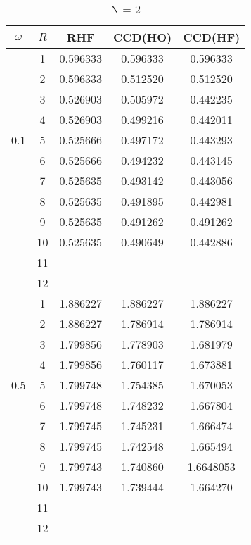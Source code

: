 \documentclass[
    a4paper, aps, twocolumn, floatfix, superscriptaddress,
    nofootinbib]{revtex4-1}
\newcommand{\1}{\mathds{1}}
\begin{document}
    \begin{table}
        \centering
        \caption{N = 2}
        \begin{ruledtabular}
            \begin{tabular}{c|c|ccc}
                $\omega$ & $R$ & RHF & CCD(HO) & CCD(HF) \\ \hline
                         &  1  & 0.596333 & 0.596333 & 0.596333 \\
                         &  2  & 0.596333 & 0.512520 & 0.512520 \\
                         &  3  & 0.526903 & 0.505972 & 0.442235 \\
                         &  4  & 0.526903 & 0.499216 & 0.442011 \\
                     0.1 &  5  & 0.525666 & 0.497172 & 0.443293 \\
                         &  6  & 0.525666 & 0.494232 & 0.443145 \\
                         &  7  & 0.525635 & 0.493142 & 0.443056 \\
                         &  8  & 0.525635 & 0.491895 & 0.442981 \\
                         &  9  & 0.525635 & 0.491262 & 0.491262 \\
                         &  10 & 0.525635 & 0.490649 & 0.442886 \\
                         &  11 & & & \\
                         &  12 &  & & \\ \hline

                         &  1  & 1.886227 & 1.886227 & 1.886227 \\
                         &  2  & 1.886227 & 1.786914 & 1.786914 \\
                         &  3  & 1.799856 & 1.778903 & 1.681979 \\
                         &  4  & 1.799856 & 1.760117 & 1.673881 \\
                     0.5 &  5  & 1.799748 & 1.754385 & 1.670053 \\
                         &  6  & 1.799748 & 1.748232 & 1.667804 \\
                         &  7  & 1.799745 & 1.745231 & 1.666474 \\
                         &  8  & 1.799745 & 1.742548 & 1.665494 \\
                         &  9  & 1.799743 & 1.740860 & 1.6648053 \\
                         &  10 & 1.799743 & 1.739444 & 1.664270 \\
                         &  11 & & & \\
                         &  12 &  & & \\ \hline


\end{tabular}
\end{ruledtabular}
\end{table}
\end{document}
